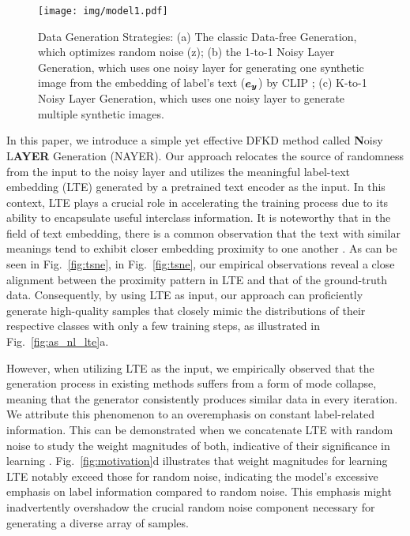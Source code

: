 \documentclass{article} %
\begin{document}
\begin{figure}[t]
\begin{center}
\texttt{[image: img/model1.pdf]}
\end{center}
\caption{Data Generation Strategies: (a) The classic Data-free Generation, which optimizes random noise (z); (b) the 1-to-1 Noisy Layer Generation, which uses one noisy layer for generating one synthetic image from the embedding of label's text (${\bm{e}}_{{\bm{y}}}$) by CLIP \citep{clip}; (c) K-to-1 Noisy Layer Generation, which uses one noisy layer to generate multiple synthetic images.}
\label{fig:model1}
\end{figure}

In this paper, we introduce a simple yet effective DFKD method called  \textbf{N}oisy L\textbf{AYER} Generation (NAYER). Our approach relocates the source of randomness from the input to the noisy layer and utilizes the meaningful label-text embedding (LTE) generated by a pretrained text encoder \citep{clip} as the input. In this context, LTE plays a crucial role in accelerating the training process due to its ability to encapsulate useful interclass information. It is noteworthy that in the field of text embedding, there is a common observation that the text with similar meanings tend to exhibit closer embedding proximity to one another \citep{doc2vec}. As can be seen in Fig.~\ref{fig:tsne}, in Fig.~\ref{fig:tsne}, our empirical observations reveal a close alignment between the proximity pattern in LTE and that of the ground-truth data. Consequently, by using LTE as input, our approach can proficiently generate high-quality samples that closely mimic the distributions of their respective classes with only a few training steps, as illustrated in Fig.~\ref{fig:as_nl_lte}a. 

However, when utilizing LTE as the input,  we empirically observed that the generation process in existing methods suffers from a form of mode collapse, meaning that the generator consistently produces similar data in every iteration. We attribute this phenomenon to an overemphasis on constant label-related information. This can be demonstrated when we concatenate LTE with random noise to study the weight magnitudes of both, indicative of their significance in learning \citep{lottery}. Fig.~\ref{fig:motivation}d illustrates that weight magnitudes for learning LTE notably exceed those for random noise, indicating the model's excessive emphasis on label information compared to random noise. This emphasis might inadvertently overshadow the crucial random noise component necessary for generating a diverse array of samples. 
\end{document}

